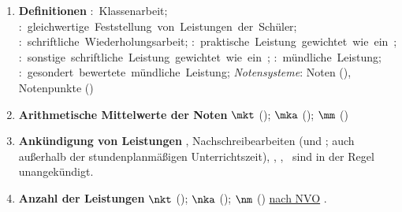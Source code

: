 \begin{enumerate}[label=\textbf{(\arabic*)}, align=left, leftmargin=*]
	\item \textbf{Definitionen} { \thisfontsize \mbox{\textbf{}: Klassenarbeit}; \mbox{\textbf{}: gleichwertige Feststellung von Leistungen der Schüler}; \mbox{\textbf{}: schriftliche Wiederholungsarbeit};  \linebreak \mbox{\textbf{}: praktische Leistung gewichtet wie ein }; \mbox{\textbf{}: sonstige schriftliche Leistung gewichtet wie ein };   \linebreak \mbox{\textbf{}: mündliche Leistung}; \mbox{\textbf{}: gesondert bewertete mündliche Leistung}; \textit{Notensysteme}: Noten (\textbf{}), Notenpunkte (\textbf{}) }
	
	\item \textbf{Arithmetische Mittelwerte der Noten}  { \thisfontsize $\mkt$ (\catkt); $\mka$ (\catka); $\mm$ (\catm) }
	
	
	\item \textbf{Ankündigung von Leistungen} { \thisfontsize {}, Nachschreibearbeiten ( und \catka; auch außerhalb der stundenplanmäßigen Unterrichtszeit), , , \catm~sind in der Regel unangekündigt.}
	\item \textbf{Anzahl der Leistungen} { \thisfontsize $\nkt$ (\catkt); $\nka$ (\catka); $\nm$ (\catm) \href{\nvourl}{nach NVO} \cite{nvo}}.
	

\end{enumerate}

